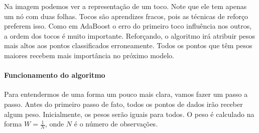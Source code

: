 \documentclass[
  letterpaper,
  DIV=11,
  numbers=noendperiod]{scrreprt}
\let\oldparagraph\paragraph
\renewcommand{\paragraph}[1]{\oldparagraph{#1}\mbox{}}
\begin{document}
Na imagem podemos ver a representação de um toco. Note que ele tem
apenas um nó com duas folhas. Tocos são aprendizes fracos, pois as
técnicas de reforço preferem isso. Como em AdaBoost o erro do primeiro
toco influência nos outros, a ordem dos tocos é muito importante.
Reforçando, o algoritmo irá atribuir pesos mais altos aos pontos
classificados erroneamente. Todos os pontos que têm pesos maiores
recebem mais importância no próximo modelo.

\hypertarget{funcionamento-do-algoritmo-1}{%
\paragraph{Funcionamento do
algoritmo}\label{funcionamento-do-algoritmo-1}}

Para entendermos de uma forma um pouco mais clara, vamos fazer um passo
a passo. Antes do primeiro passo de fato, todos os pontos de dados irão
receber algum peso. Inicialmente, os pesos serão iguais para todos. O
peso é calculado na forma \(W = \frac{1}{N}\), onde \(N\) é o número de
observações.
\end{document}
